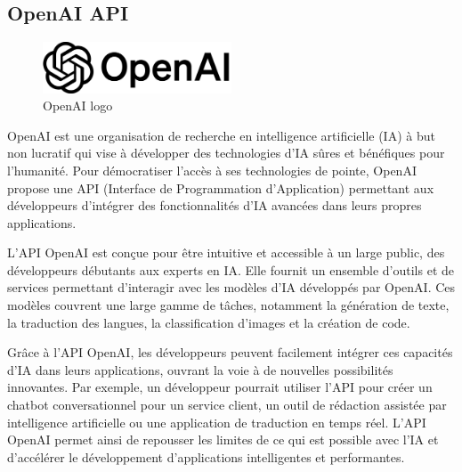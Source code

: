 \documentclass[a4paper,12pt]{report}
\numberwithin{equation}{section}
\begin{document}
\subsection{OpenAI API}
\vspace{1cm}
\begin{figure}[H]
    \centering
    \includegraphics[width=0.5\textwidth]{tech/openai-logo.png}
    \caption{OpenAI logo}
    \label{fig:OpenAI logo}
\end{figure}
\vspace{1cm}
\par
OpenAI est une organisation de recherche en intelligence artificielle (IA) à but non lucratif qui vise à développer des technologies d'IA sûres et bénéfiques pour l'humanité. Pour démocratiser l'accès à ses technologies de pointe, OpenAI propose une API (Interface de Programmation d'Application) permettant aux développeurs d'intégrer des fonctionnalités d'IA avancées dans leurs propres applications.
\\ \par
L'API OpenAI est conçue pour être intuitive et accessible à un large public, des développeurs débutants aux experts en IA. Elle fournit un ensemble d'outils et de services permettant d'interagir avec les modèles d'IA développés par OpenAI. Ces modèles couvrent une large gamme de tâches, notamment la génération de texte, la traduction des langues, la classification d'images et la création de code.
\\ \par
Grâce à l'API OpenAI, les développeurs peuvent facilement intégrer ces capacités d'IA dans leurs applications, ouvrant la voie à de nouvelles possibilités innovantes. Par exemple, un développeur pourrait utiliser l'API pour créer un chatbot conversationnel pour un service client, un outil de rédaction assistée par intelligence artificielle ou une application de traduction en temps réel. L'API OpenAI permet ainsi de repousser les limites de ce qui est possible avec l'IA et d'accélérer le développement d'applications intelligentes et performantes.
\newpage
\end{document}

